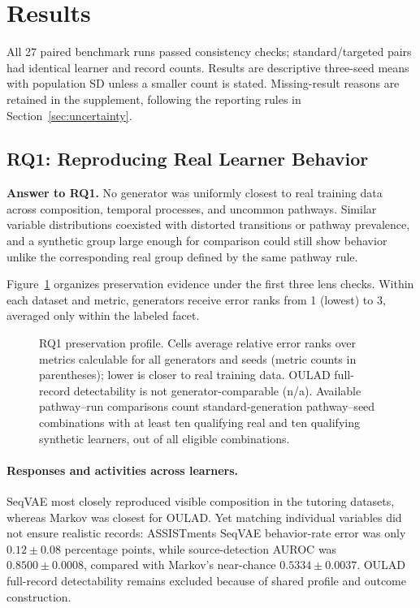 \documentclass[fleqn,10pt]{JLA_article}
\begin{document}
\section{Results}

All 27 paired benchmark runs passed consistency checks; standard/targeted pairs had identical learner and record counts. Results are descriptive three-seed means with population SD unless a smaller count is stated. Missing-result reasons are retained in the supplement, following the reporting rules in Section~\ref{sec:uncertainty}.

\subsection{RQ1: Reproducing Real Learner Behavior}
\label{sec:rq1-results}

\textbf{Answer to RQ1.} No generator was uniformly closest to real training data across composition, temporal processes, and uncommon pathways. Similar variable distributions coexisted with distorted transitions or pathway prevalence, and a synthetic group large enough for comparison could still show behavior unlike the corresponding real group defined by the same pathway rule.

Figure~\ref{fig:rq1-construct-profile} organizes preservation evidence under the first three lens checks. Within each dataset and metric, generators receive error ranks from 1 (lowest) to 3, averaged only within the labeled facet.

\begin{figure}[!htbp]
\centering
\resizebox{\linewidth}{!}{}
\caption{RQ1 preservation profile. Cells average relative error ranks over metrics calculable for all generators and seeds (metric counts in parentheses); lower is closer to real training data. OULAD full-record detectability is not generator-comparable (n/a). Available pathway--run comparisons count standard-generation pathway--seed combinations with at least ten qualifying real and ten qualifying synthetic learners, out of all eligible combinations.}
\label{fig:rq1-construct-profile}
\end{figure}

\paragraph{Responses and activities across learners.}
SeqVAE most closely reproduced visible composition in the tutoring datasets, whereas Markov was closest for OULAD. Yet matching individual variables did not ensure realistic records: ASSISTments SeqVAE behavior-rate error was only \(0.12\pm0.08\) percentage points, while source-detection AUROC was \(0.8500\pm0.0008\), compared with Markov's near-chance \(0.5334\pm0.0037\). OULAD full-record detectability remains excluded because of shared profile and outcome construction.
\end{document}
